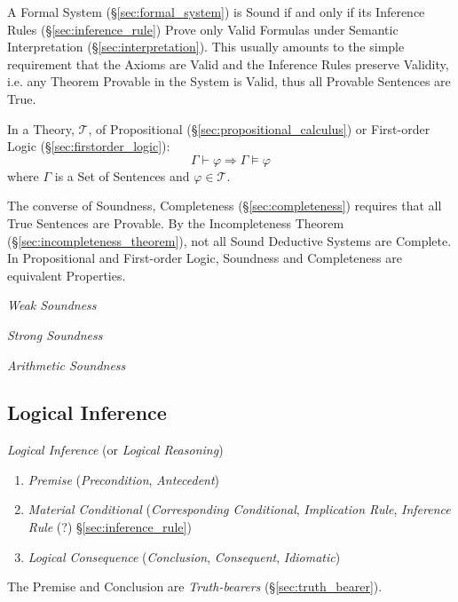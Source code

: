 A Formal System (\S\ref{sec:formal_system}) is Sound if and only if
its Inference Rules (\S\ref{sec:inference_rule}) Prove only Valid
Formulas under Semantic Interpretation (\S\ref{sec:interpretation}).
This usually amounts to the simple requirement that the Axioms are
Valid and the Inference Rules preserve Validity, i.e. any Theorem
Provable in the System is Valid, thus all Provable Sentences are True.

In a Theory, $\mathcal{T}$, of Propositional
(\S\ref{sec:propositional_calculus}) or First-order Logic
(\S\ref{sec:firstorder_logic}):
\[
  \Gamma \vdash \varphi \Rightarrow \Gamma \vDash \varphi
\]
where $\Gamma$ is a Set of Sentences and $\varphi \in \mathcal{T}$.

The converse of Soundness, Completeness (\S\ref{sec:completeness})
requires that all True Sentences are Provable. By the Incompleteness
Theorem (\S\ref{sec:incompleteness_theorem}), not all Sound Deductive
Systems are Complete. In Propositional and First-order Logic,
Soundness and Completeness are equivalent Properties.

\emph{Weak Soundness}

\emph{Strong Soundness}

\emph{Arithmetic Soundness}



\subsection{Logical Inference}\label{sec:logical_inference}

\emph{Logical Inference} (or \emph{Logical Reasoning})

\begin{enumerate}
\item \emph{Premise} (\emph{Precondition}, \emph{Antecedent})

\item \emph{Material Conditional} (\emph{Corresponding Conditional},
  \emph{Implication Rule}, \emph{Inference Rule} (?)
  \S\ref{sec:inference_rule})

\item \emph{Logical Consequence} (\emph{Conclusion},
  \emph{Consequent}, \emph{Idiomatic})
\end{enumerate}

The Premise and Conclusion are \emph{Truth-bearers}
(\S\ref{sec:truth_bearer}).


